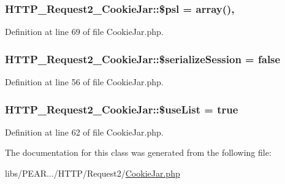 \hypertarget{classHTTP__Request2__CookieJar_a3ff030e15c5780c2812814e8e7d3131d}{}
\subsubsection[{\$psl}]{\setlength{\rightskip}{0pt plus 5cm}H\+T\+T\+P\+\_\+\+Request2\+\_\+\+Cookie\+Jar\+::\$psl = array()\hspace{0.3cm}{\ttfamily [static]}, {\ttfamily [protected]}}\label{classHTTP__Request2__CookieJar_a3ff030e15c5780c2812814e8e7d3131d}


Definition at line 69 of file Cookie\+Jar.\+php.

\hypertarget{classHTTP__Request2__CookieJar_ae5e881693fdcfe8cdc23966be0d8a218}{}
\subsubsection[{\$serialize\+Session}]{\setlength{\rightskip}{0pt plus 5cm}H\+T\+T\+P\+\_\+\+Request2\+\_\+\+Cookie\+Jar\+::\$serialize\+Session = false\hspace{0.3cm}{\ttfamily [protected]}}\label{classHTTP__Request2__CookieJar_ae5e881693fdcfe8cdc23966be0d8a218}


Definition at line 56 of file Cookie\+Jar.\+php.

\hypertarget{classHTTP__Request2__CookieJar_a931db790fefc72638f7220fc45f16a55}{}
\subsubsection[{\$use\+List}]{\setlength{\rightskip}{0pt plus 5cm}H\+T\+T\+P\+\_\+\+Request2\+\_\+\+Cookie\+Jar\+::\$use\+List = true\hspace{0.3cm}{\ttfamily [protected]}}\label{classHTTP__Request2__CookieJar_a931db790fefc72638f7220fc45f16a55}


Definition at line 62 of file Cookie\+Jar.\+php.



The documentation for this class was generated from the following file\+:\begin{DoxyCompactItemize}
\item 
libs/\+P\+E\+A\+R.../\+H\+T\+T\+P/\+Request2/\hyperlink{CookieJar_8php}{Cookie\+Jar.\+php}\end{DoxyCompactItemize}
